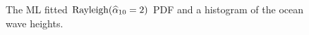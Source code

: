 \begin{figure}[htpb]
\caption{The ML fitted ${\rm Rayleigh}(\widehat{\alpha}_{10}= 2)$ PDF and a histogram of the ocean wave heights.\label{F:RayleighOceanHeightsMLE}}
\centering   {}
\end{figure}
